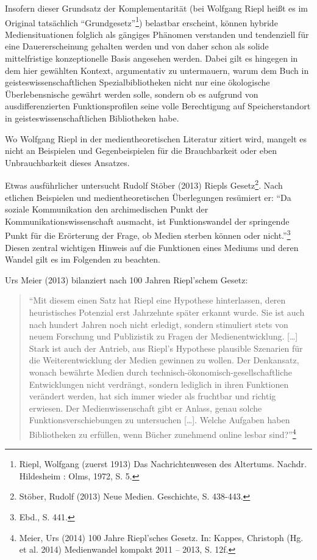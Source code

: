 \documentclass[a4paper,
fontsize=11pt,
oneside,
numbers=noperiodatend,
parskip=half-,
bibliography=totoc,
final
]{scrartcl}
\begin{document}
Insofern dieser Grundsatz der Komplementarität (bei Wolfgang Riepl heißt
es im Original tatsächlich \enquote{Grundgesetz}\footnote{Riepl,
  Wolfgang (zuerst 1913) Das Nachrichtenwesen des Altertums. Nachdr.
  Hildesheim : Olms, 1972, S. 5.}) belastbar erscheint, können hybride
Mediensituationen folglich als gängiges Phänomen verstanden und
tendenziell für eine Dauererscheinung gehalten werden und von daher
schon als solide mittelfristige konzeptionelle Basis angesehen werden.
Dabei gilt es hingegen in dem hier gewählten Kontext, argumentativ zu
untermauern, warum dem Buch in geisteswissenschaftlichen
Spezialbibliotheken nicht nur eine ökologische Überlebensnische gewährt
werden solle, sondern ob es aufgrund von ausdifferenzierten
Funktionsprofilen seine volle Berechtigung auf Speicherstandort in
geisteswissenschaftlichen Bibliotheken habe.

Wo Wolfgang Riepl in der medientheoretischen Literatur zitiert wird,
mangelt es nicht an Beispielen und Gegenbeispielen für die Brauchbarkeit
oder eben Unbrauchbarkeit dieses Ansatzes.

Etwas ausführlicher untersucht Rudolf Stöber (2013) Riepls
Gesetz\footnote{Stöber, Rudolf (2013) Neue Medien. Geschichte, S.
  438-443.}. Nach etlichen Beispielen und medientheoretischen
Überlegungen resümiert er: \enquote{Da soziale Kommunikation den
archimedischen Punkt der Kommunikationswissenschaft ausmacht, ist
Funktionswandel der springende Punkt für die Erörterung der Frage, ob
Medien sterben können oder nicht.}\footnote{Ebd., S. 441.} Diesen
zentral wichtigen Hinweis auf die Funktionen eines Mediums und deren
Wandel gilt es im Folgenden zu beachten.

Urs Meier (2013) bilanziert nach 100 Jahren Riepl'schem Gesetz:

\begin{quote}
\enquote{Mit diesem einen Satz hat Riepl eine Hypothese hinterlassen,
deren heuristisches Potenzial erst Jahrzehnte später erkannt wurde. Sie
ist auch nach hundert Jahren noch nicht erledigt, sondern stimuliert
stets von neuem Forschung und Publizistik zu Fragen der
Medienentwicklung. {[}\ldots{}{]} Stark ist auch der Antrieb, aus
Riepl's Hypothese plausible Szenarien für die Weiterentwicklung der
Medien gewinnen zu wollen. Der Denkansatz, wonach bewährte Medien durch
technisch-ökonomisch-gesellschaftliche Entwicklungen nicht verdrängt,
sondern lediglich in ihren Funktionen verändert werden, hat sich immer
wieder als fruchtbar und richtig erwiesen. Der Medienwissenschaft gibt
er Anlass, genau solche Funktionsverschiebungen zu untersuchen
{[}\ldots{}{]}. Welche Aufgaben haben Bibliotheken zu erfüllen, wenn
Bücher zunehmend online lesbar sind?}\footnote{Meier, Urs (2014) 100
  Jahre Riepl'sches Gesetz. In: Kappes, Christoph (Hg. et al. 2014)
  Medienwandel kompakt 2011 -- 2013, S. 12f.}
\end{quote}
\end{document}
